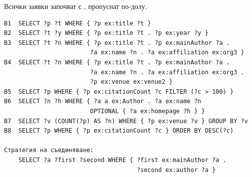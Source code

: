 Всички заявки започват с , пропуснат по-долу.

\begin{lstlisting}[language={},caption={Работно натоварване}]
B1  SELECT ?p ?t WHERE { ?p ex:title ?t }
B2  SELECT ?t ?y WHERE { ?p ex:title ?t . ?p ex:year ?y }
B3  SELECT ?t ?n WHERE { ?p ex:title ?t . ?p ex:mainAuthor ?a .
                        ?a ex:name ?n . ?a ex:affiliation ex:org3 }
B4  SELECT ?t ?n WHERE { ?p ex:title ?t . ?p ex:mainAuthor ?a .
                        ?a ex:name ?n . ?a ex:affiliation ex:org3 .
                        ?p ex:venue ex:venue2 }
B5  SELECT ?p WHERE { ?p ex:citationCount ?c FILTER (?c > 100) }
B6  SELECT ?n ?h WHERE { ?a a ex:Author . ?a ex:name ?n
                        OPTIONAL { ?a ex:homepage ?h } }
B7  SELECT ?v (COUNT(?p) AS ?n) WHERE { ?p ex:venue ?v } GROUP BY ?v
B8  SELECT ?p WHERE { ?p ex:citationCount ?c } ORDER BY DESC(?c)

Стратегия на съединяване:
    SELECT ?a ?first ?second WHERE { ?first ex:mainAuthor ?a .
                                     ?second ex:author ?a }
\end{lstlisting}
